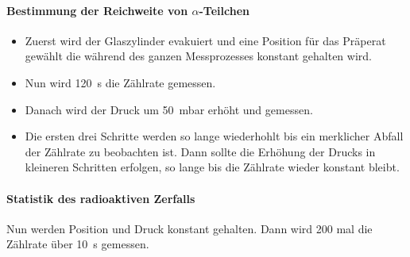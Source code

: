 \paragraph{Bestimmung der Reichweite von \texorpdfstring{$\alpha$}{math}-Teilchen}
\begin{itemize}
  \item Zuerst wird der Glaszylinder evakuiert und eine Position für das Präperat gewählt
  die während des ganzen Messprozesses konstant gehalten wird.
  \item Nun wird \SI{120}{\second} die Zählrate gemessen.
  \item Danach wird der Druck um \SI{50}{\milli\bar} erhöht und gemessen.
  \item Die ersten drei Schritte werden so lange wiederhohlt bis ein merklicher
  Abfall der Zählrate zu beobachten ist. Dann sollte die Erhöhung der Drucks in
  kleineren Schritten erfolgen, so lange bis die Zählrate wieder konstant bleibt.
\end{itemize}
\paragraph{Statistik des radioaktiven Zerfalls}
Nun werden Position und Druck konstant gehalten. Dann wird 200 mal die
Zählrate über \SI{10}{\second} gemessen.
